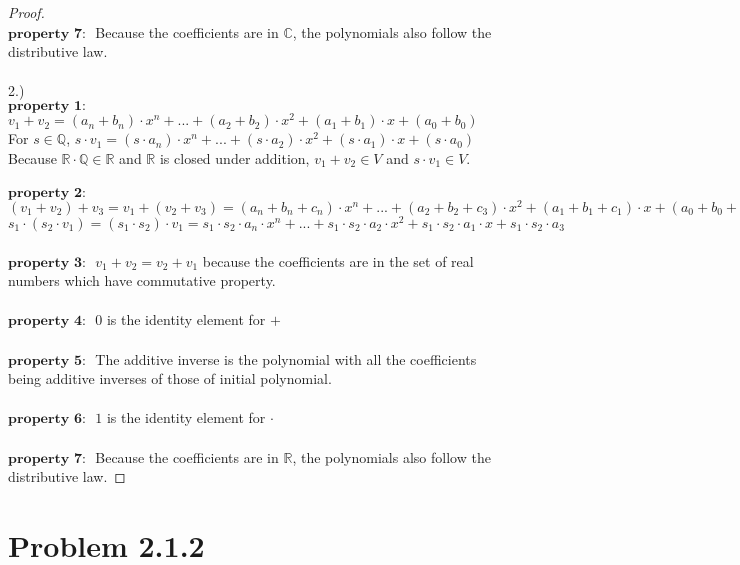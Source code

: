 \documentclass[12pt]{article}
\begin{document}
\begin{proof}
 \\$\textbf {property 7: }$
 Because the coefficients are in $\mathbb{C}$, the polynomials also follow the distributive law.
 \\
 \\2.)
 \\$\textbf {property 1: }$
 \\$v_1 + v_2 = (a_n + b_n) \cdot x^n + ... +(a_2 + b_2) \cdot x^2 +(a_1 + b_1) \cdot x + (a_0 + b_0) $
 \\ For $s \in \mathbb{Q}$, $s \cdot v_1 = (s \cdot a_n) \cdot x^n + ... + (s \cdot a_2) \cdot x^2 + (s \cdot a_1) \cdot x + (s \cdot a_0)$
 \\Because $\mathbb{R} \cdot \mathbb{Q} \in \mathbb{R}$ and $\mathbb{R}$ is closed under addition, $v_1+v_2 \in V$ and $s \cdot v_1 \in V$.
 \\
 \\$\textbf {property 2: }$
 $(v_1+v_2)+v_3 = v_1+(v_2+v_3) = (a_n+b_n+c_n) \cdot x^n + ... +(a_2+b_2+c_3) \cdot x^2+(a_1+b_1+c_1) \cdot x + (a_0+b_0+c_0) $
 \\ $s_1\cdot(s_2\cdot v_1)=(s_1 \cdot s_2)\cdot v_1=s_1 \cdot s_2 \cdot a_n \cdot x^n+...+s_1 \cdot s_2 \cdot a_2 \cdot x^2 + s_1 \cdot s_2 \cdot a_1 \cdot x + s_1 \cdot s_2 \cdot a_3$
 \\
 \\$\textbf {property 3: }$
 $v_1+v_2 = v_2+v_1$ because the coefficients are in the set of real numbers which have commutative property.
 \\
 \\$\textbf {property 4: }$
 $0$ is the identity element for $+$
 \\
 \\$\textbf {property 5: }$
 The additive inverse is the polynomial with all the coefficients being additive inverses of those of initial polynomial.
 \\
 \\$\textbf {property 6: }$
 $1$ is the identity element for $\cdot$
 \\
 \\$\textbf {property 7: }$
 Because the coefficients are in $\mathbb{R}$, the polynomials also follow the distributive law.
\end{proof}

\newpage 

\section{Problem 2.1.2}
\end{document}
